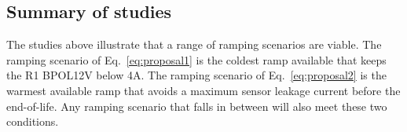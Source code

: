 \subsection{Summary of studies}

The studies above illustrate that a range of ramping scenarios are viable. The ramping scenario of
Eq.~\ref{eq:proposal1} is the coldest ramp available that keeps the R1 BPOL12V below 4A. The ramping
scenario of Eq.~\ref{eq:proposal2} is the warmest available ramp that avoids a maximum sensor leakage
current before the end-of-life. Any ramping scenario that falls in between will also meet these two
conditions.
